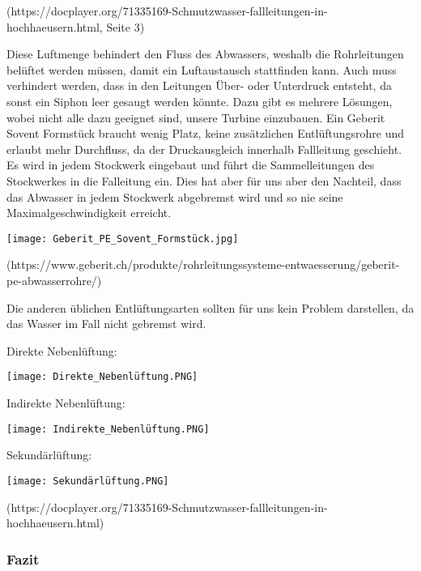 (https://docplayer.org/71335169-Schmutzwasser-fallleitungen-in-hochhaeusern.html, Seite 3)

Diese Luftmenge behindert den Fluss des Abwassers, weshalb die Rohrleitungen belüftet werden müssen, damit ein Luftaustausch stattfinden kann. Auch muss verhindert werden, dass in den Leitungen Über- oder Unterdruck entsteht, da sonst ein Siphon leer gesaugt werden könnte. Dazu gibt es mehrere Lösungen, wobei nicht alle dazu geeignet sind, unsere Turbine einzubauen. Ein Geberit Sovent Formstück braucht wenig Platz, keine zusätzlichen Entlüftungsrohre und erlaubt mehr Durchfluss, da der Druckausgleich innerhalb Fallleitung geschieht. Es wird in jedem Stockwerk eingebaut und führt die Sammelleitungen des Stockwerkes in die Falleitung ein. Dies hat aber für uns aber den Nachteil, dass das Abwasser in jedem Stockwerk abgebremst wird und so nie seine Maximalgeschwindigkeit erreicht.

\begin{center}

\texttt{[image: Geberit\_PE\_Sovent\_Formstück.jpg]}

\end{center}

(https://www.geberit.ch/produkte/rohrleitungssysteme-entwaesserung/geberit-pe-abwasserrohre/)

Die anderen üblichen Entlüftungsarten sollten für uns kein Problem darstellen, da das Wasser im Fall nicht gebremst wird.


Direkte Nebenlüftung:

\begin{center}

\texttt{[image: Direkte\_Nebenlüftung.PNG]}

\end{center}

Indirekte Nebenlüftung:

\begin{center}

\texttt{[image: Indirekte\_Nebenlüftung.PNG]}

\end{center}

Sekundärlüftung:

\begin{center}

\texttt{[image: Sekundärlüftung.PNG]}

\end{center}

(https://docplayer.org/71335169-Schmutzwasser-fallleitungen-in-hochhaeusern.html)





\subsubsection{Fazit}



\clearpage 






